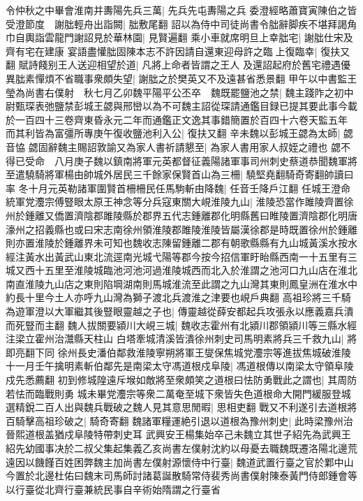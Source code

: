 令仲秋之中畢會淮南并夀陽先兵三萬|{
	先兵先屯夀陽之兵}
委澄經略蕭寶寅陳伯之皆受澄節度　謝朏輕舟出詣闕|{
	朏敷尾翻}
詔以為侍中司徒尚書令朏辭脚疾不堪拜謁角巾自輿詣雲龍門謝詔見於華林園|{
	見賢遍翻}
乘小車就席明旦上幸朏宅|{
	謝朏仕宋及齊有宅在建康}
宴語盡懽朏固陳本志不許因請自還東迎母許之臨上復臨幸|{
	復扶又翻}
賦詩餞别王人送迎相望於道|{
	凡將上命者皆謂之王人}
及還詔起府於舊宅禮遇優異朏素憚煩不省職事衆頗失望|{
	謝朏之於樊英又不及遠甚省悉景翻}
甲午以中書監王瑩為尚書右僕射　秋七月乙卯魏平陽平公丕卒　魏既罷鹽池之禁|{
	魏主踐阼之初中尉甄琛表弛鹽禁彭城王勰與邢巒以為不可魏主詔從琛請通鑑目録已提其要此事今載於一百四十三卷齊東昏永元二年而通鑑正文逸其事錯簡置於百四十六卷天監五年}
而其利皆為富彊所專庚午復收鹽池利入公|{
	復扶又翻}
辛未魏以彭城王勰為太師|{
	勰音恊}
勰固辭魏主賜詔敦諭又為家人書祈請懇至|{
	為家人書用家人叔姪之禮也}
勰不得已受命　八月庚子魏以鎮南將軍元英都督征義陽諸軍事司州刺史蔡道恭聞魏軍將至遣驍騎將軍楊由帥城外居民三千餘家保賢首山為三柵|{
	驍堅堯翻騎奇寄翻帥讀曰率}
冬十月元英勒諸軍圍賢首柵柵民任馬駒斬由降魏|{
	任音壬降戶江翻}
任城王澄命統軍党灋宗傅豎眼太原王神念等分兵寇東關大峴淮陵九山|{
	淮陵恐當作雎陵齊置徐州於鍾離又僑置濟陰郡雎陵縣於郡界五代志鍾離郡化明縣舊曰睢陵置濟陰郡化明唐濠州之招義縣也或曰宋志南徐州領淮陵郡雎陵淮陵皆屬漢徐郡是時既置徐州於鍾離則亦置淮陵於鍾離界未可知也魏收志陳留鍾離二郡有朝歌縣縣有九山城黃溪水按水經注黃水出黃武山東北流逕南光城弋陽等郡今按今招信軍盱眙縣西南一十五里有三城又西十五里至淮陵城臨池河池河過淮陵城西而北入於淮謂之池河口九山店在淮北南直淮陵九山店之東則陷堈湖南則馬城淮流至此謂之九山灣其東則鳳皇洲在淮水中約長十里今土人亦呼九山灣為獅子渡北兵渡淮之津要也峴戶典翻}
高祖珍將三千騎為遊軍澄以大軍繼其後豎眼靈越之子也|{
	傳靈越從薛安都起兵攻張永以應義嘉兵潰而死豎而主翻}
魏人拔關要潁川大峴三城|{
	魏收志霍州有北潁川郡領潁川等三縣水經注梁立霍州治灊縣天柱山}
白塔牽城清溪皆潰徐州刺史司馬明素將兵三千救九山|{
	將即亮翻下同}
徐州長史潘伯鄰救淮陵寧朔將軍王燮保焦城党灋宗等進拔焦城破淮陵十一月壬午擒明素斬伯鄰先是南梁太守馮道根戍阜陵|{
	馮道根傳以南梁太守領阜陵戍先悉薦翻}
初到修城隍遠斥堠如敵將至衆頗笑之道根曰怯防勇戰此之謂也|{
	其周防若怯而臨戰則勇}
城未畢党灋宗等衆二萬奄至城下衆皆失色道根命大開門緩服登城選精銳二百人出與魏兵戰破之魏人見其意思閒暇|{
	思相吏翻}
戰又不利遂引去道根將百騎擊高祖珍破之|{
	騎奇寄翻}
魏諸軍糧運絶引退以道根為豫州刺史|{
	此時梁豫州治晉熙道根盖猶戍阜陵特帶刺史耳}
武興安王楊集始卒己未魏立其世子紹先為武興王紹先幼國事决於二叔父集起集義乙亥尚書左僕射沈約以母憂去職魏既遷洛陽北邊荒遠因以饑饉百姓困弊魏主加尚書左僕射源懷侍中行臺|{
	魏道武置行臺之官於鄴中山今置於北邊杜佑曰魏末司馬師討諸葛誕散騎常侍裴秀尚書僕射陳泰黃門侍郎鍾會等以行臺從北齊行臺兼統民事自辛術始隋謂之行臺省}
